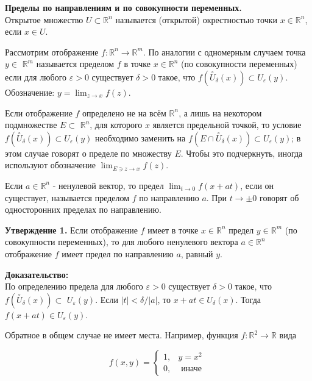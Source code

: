 \documentclass[a4paper,12pt]{article} %
\begin{document}
	\textbf{	Пределы по направлениям и по совокупности переменных.}\\
	Открытое множество $U \subset \mathbb{R}^{n}$ называется (открытой) окрестностью точки $x \in \mathbb{R}^{n}$, если $x \in U$.
	
	Рассмотрим отображение $f: \mathbb{R}^{n} \rightarrow \mathbb{R}^{m}$. По аналогии с одномерным случаем точка $y \in$ $\mathbb{R}^{m}$ называется пределом $f$ в точке $x \in \mathbb{R}^{n}$ (по совокупности переменных) если для любого $\varepsilon>0$ существует $\delta>0$ такое, что $f\left(\stackrel{\circ}{U}_{\delta}(x)\right) \subset U_{\varepsilon}(y)$. Обозначение: $y=\lim _{z \rightarrow x} f(z)$.
	
	Если отображение $f$ определено не на всём $\mathbb{R}^{n}$, а лишь на некотором подмножестве $E \subset$ $\mathbb{R}^{n}$, для которого $x$ является предельной точкой, то условие $f\left(\stackrel{\circ}{U}_{\delta}(x)\right) \subset U_{\varepsilon}(y)$ необходимо заменить на $f\left(E \cap \stackrel{\circ}{U}_{\delta}(x)\right) \subset U_{\varepsilon}(y)$; в этом случае говорят о пределе по множеству $E$. Чтобы это подчеркнуть, иногда используют обозначение $\lim _{E \ni z \rightarrow x} f(z)$.
	
	Если $a \in \mathbb{R}^{n}$ - ненулевой вектор, то предел $\lim _{t \rightarrow 0} f(x+a t)$, если он существует, называется пределом $f$ по направлению $a$. При $t \rightarrow \pm 0$ говорят об односторонних пределах по направлению.
	
	\textbf{Утверждение 1.} Если отображение $f$ имеет в точке $x \in \mathbb{R}^{n}$ предел $y \in \mathbb{R}^{m}$ (по совокупности переменных), то для любого ненулевого вектора $a \in \mathbb{R}^{n}$ отображение $f$ имеет предел по направлению $a$, равный $y$.
	
	\textbf{Доказательство:\\}
	По определению предела для любого $\varepsilon>0$ существует $\delta>0$ такое, что $f\left(\stackrel{\circ}{U}_{\delta}(x)\right) \subset$ $U_{\varepsilon}(y)$. Если $|t|<\delta /|a|$, то $x+a t \in U_{\delta}(x)$. Тогда $f(x+a t) \in U_{\varepsilon}(y)$.
	
	Обратное в общем случае не имеет места. Например, функция $f: \mathbb{R}^{2} \rightarrow \mathbb{R}$ вида
	
	$$
	f(x, y)= \begin{cases}1, & y=x^{2} \\ 0, & \text { иначе }\end{cases}
	$$
	
\end{document}
